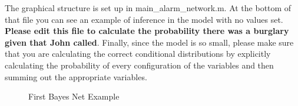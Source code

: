 \documentclass[12pt]{article}
\begin{document}
{	 The graphical structure is set up in main\_alarm\_network.m.  At the bottom of that file you can see an example of inference in the model with no values set. {\bf Please edit this file to calculate the probability there was a burglary given that John called}. Finally, since the model is so small, please make sure that you are calculating the correct conditional distributions by explicitly calculating the probability of every configuration of the variables and then summing out the appropriate variables.\\
	 \begin{figure}
		\begin{center}
			\caption{First Bayes Net Example}
			\label{bnexample}
		\end{center} 
	\end{figure} 
}
\end{document}
